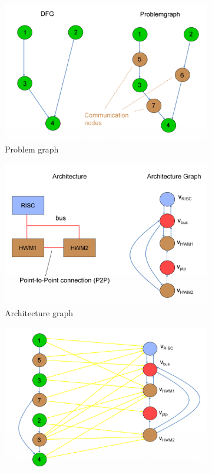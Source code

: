 \begin{figure}
	\begin{center}
		\begin{subfigure}[b]{0.45\textwidth}
			\includegraphics[width=\textwidth]{images/Problem_graph.png}
			\caption{Problem graph}
		\end{subfigure}
		\hfill
		\begin{subfigure}[b]{0.45\textwidth}
			\includegraphics[width=\textwidth]{images/Architecture_graph.png}
			\caption{Architecture graph}
		\end{subfigure}
		\begin{subfigure}[b]{0.45\textwidth}
			\includegraphics[width=\textwidth]{images/Specification_graph.png}

\end{subfigure}
\end{center}
\end{figure}
